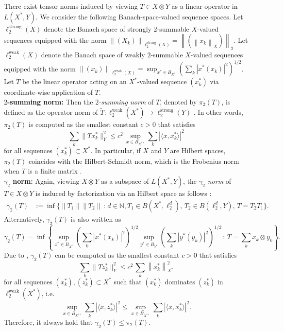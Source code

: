 \documentclass[11pt]{article}
\newcommand{\norm}[1]{\left \|#1 \right \|}
\begin{document}
There exist tensor norms induced by viewing $T \in X \otimes Y$ as a linear operator in $L(X^*,Y)$. 
We consider the following Banach-space-valued sequence spaces. 
Let $\ell_2^\mathrm{strong}(X)$ denote the Banach space of strongly $2$-summable $X$-valued sequences equipped with the norm $\norm{(X_k)}_{\ell_2^\mathrm{strong}(X)} = \norm{(\norm{x_k}_X)}_2$. 
Let $\ell_2^\mathrm{weak}(X)$ denote the Banach space of weakly $2$-summable $X$-valued sequences equipped with the norm $\norm{(x_k)}_{\ell_2^\mathrm{weak}(X)} = \sup_{x^* \in B_{X^*}} (\sum_k |x^*(x_k)|^2)^{1/2}$. 
Let $\tilde{T}$ be the linear operator acting on an $X^*$-valued sequence $(x^*_k)$ via coordinate-wise application of $T$. \\

\noindent\textbf{$2$-summing norm: } 
Then the \textit{$2$-summing norm} of $T$, denoted by $\pi_2(T)$, is defined as the operator norm of $\tilde{T}: \ell_2^\mathrm{weak}(X^*) \rightarrow \ell_2^\mathrm{strong}(Y)$ \citep{diestel1985introduction}. 
In other words, $\pi_2(T)$ is computed as the smallest constant $c > 0$ that satisfies
\[
\sum_k \|T x^*_k\|_Y^2
\leq c^2 \, \sup_{x \in B_{X^{**}}} \sum_k |\langle x, x^*_k\rangle|^2
\]
for all sequences $(x^*_k) \subset X^*$. 
In particular, if $X$ and $Y$ are Hilbert spaces, $\pi_2(T)$ coincides with the Hilbert-Schmidt norm, which is the Frobenius norm when $T$ is a finite matrix \citep[Proposition~1.9]{pisier1986factorization}. \\

\noindent\textbf{$\gamma_2$ norm: } 
Again, viewing $X \otimes Y$ as a subspace of $L(X^*,Y)$, the \textit{$\gamma_2$ norm} of $T \in X \otimes Y$ is induced by factorization via an Hilbert space as follows \citep[p.~21]{pisier1986factorization}:
\begin{align*}
\gamma_2(T) &:= \inf \{ \|T_1\| \|T_2\| \,:\, d \in \mathbb{N}, T_1 \in B(X^*,\ell_2^d), \, T_2 \in B(\ell_2^d,Y), \, T = T_2 T_1 \}.
\end{align*}
Alternatively, $\gamma_2(T)$ is also written as
\[
\gamma_2(T) = \inf \left\{ 
\sup_{x^* \in B_{X^*}} \left( \sum_k |x^*(x_k)|^2 \right)^{1/2} 
\sup_{y^* \in B_{Y^*}} \left( \sum_k |y^*(y_k)|^2 \right)^{1/2} \,:\, T = \sum_k x_k \otimes y_k
\right\}.
\]
Due to \citep[Theorem~2.4]{pisier1986factorization}, $\gamma_2(T)$ can be computed as the smallest constant $c > 0$ that satisfies
\[
\sum_k \|T z^*_k\|_Y^2
\leq c^2 \, \sum_k \norm{x^*_k}_{X^*}^2
\]
for all sequences $(x^*_k), (z^*_k) \subset X^*$ such that $(x^*_k)$ dominates $(z^*_k)$ in $\ell_2^\mathrm{weak}(X^*)$, i.e. 
\[
\sup_{x \in B_{X^{**}}} \sum_k |\langle x, z^*_k\rangle|^2
\leq
\sup_{x \in B_{X^{**}}} \sum_k |\langle x, x^*_k\rangle|^2.
\] 
Therefore, it always hold that $\gamma_2(T) \leq \pi_2(T)$. \\
\end{document}
